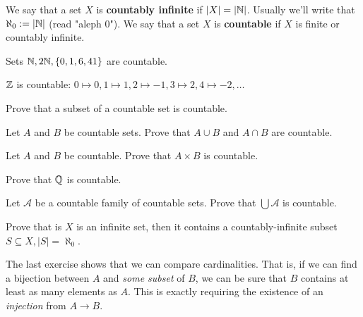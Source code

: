 \begin{definition}
  We say that a set $X$ is \textbf{countably infinite} if $|X|=|\mathbb N|$. Usually we'll write that $\aleph_0:=|\mathbb N|$ (read "aleph 0").
  We say that a set $X$ is \textbf{countable} if $X$ is finite or countably infinite.
\end{definition}

\begin{example}
  Sets $\mathbb N, 2\mathbb N, \{0,1,6, 41\}$ are countable.
\end{example}

\begin{example}
  $\mathbb Z$ is countable: $0\mapsto 0, 1\mapsto 1, 2\mapsto -1, 3\mapsto 2, 4\mapsto -2,\dots$
\end{example}

\begin{exercise}
  Prove that a subset of a countable set is countable.
\end{exercise}

\begin{exercise}
  Let $A$ and $B$ be countable sets. Prove that $A\cup B$ and $A\cap B$ are countable.
\end{exercise}

\begin{exercise}
  Let $A$ and $B$ be countable. Prove that $A\times B$ is countable. 
\end{exercise}

\begin{exercise}
  Prove that $\mathbb Q$ is countable.
\end{exercise}

\begin{exercise}
  Let $\mathcal A$ be a countable family of countable sets. Prove that $\bigcup \mathcal A$ is countable.
\end{exercise}

\begin{exercise}
  Prove that is $X$ is an infinite set, then it contains a countably-infinite subset $S\subseteq X, |S|=\aleph_0$.
\end{exercise}

The last exercise shows that we can compare cardinalities. That is, if we can find a bijection between $A$ and \textit{some subset} of $B$, we can be sure that $B$ contains at least
as many elements as $A$. This is exactly requiring the existence of an \textit{injection} from $A\to B$.

